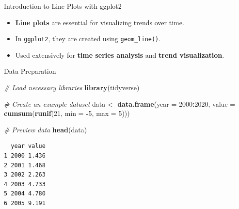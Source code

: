 \documentclass[
  ignorenonframetext,
]{beamer}
\newenvironment{Shaded}{\begin{snugshade}}{\end{snugshade}}
\newcommand{\AttributeTok}[1]{\textcolor[rgb]{0.13,0.29,0.53}{#1}}
\newcommand{\CommentTok}[1]{\textcolor[rgb]{0.56,0.35,0.01}{\textit{#1}}}
\newcommand{\DecValTok}[1]{\textcolor[rgb]{0.00,0.00,0.81}{#1}}
\newcommand{\FunctionTok}[1]{\textcolor[rgb]{0.13,0.29,0.53}{\textbf{#1}}}
\newcommand{\NormalTok}[1]{#1}
\newcommand{\OtherTok}[1]{\textcolor[rgb]{0.56,0.35,0.01}{#1}}
\newcommand{\SpecialCharTok}[1]{\textcolor[rgb]{0.81,0.36,0.00}{\textbf{#1}}}
\providecommand{\tightlist}{%
  \setlength{\itemsep}{0pt}\setlength{\parskip}{0pt}}
\begin{document}
\begin{frame}[fragile]{Introduction to Line Plots with ggplot2}
\label{introduction-to-line-plots-with-ggplot2}
\begin{itemize}
\tightlist
\item
  \textbf{Line plots} are essential for visualizing trends over time.
\item
  In \texttt{ggplot2}, they are created using \texttt{geom\_line()}.
\item
  Used extensively for \textbf{time series analysis} and \textbf{trend
  visualization}.
\end{itemize}
\end{frame}

\begin{frame}[fragile]{Data Preparation}
\label{data-preparation}
\begin{Shaded}
\begin{Highlighting}[]
\CommentTok{\# Load necessary libraries}
\FunctionTok{library}\NormalTok{(tidyverse)}

\CommentTok{\# Create an example dataset}
\NormalTok{data }\OtherTok{\textless{}{-}} \FunctionTok{data.frame}\NormalTok{(}\AttributeTok{year =} \DecValTok{2000}\SpecialCharTok{:}\DecValTok{2020}\NormalTok{, }\AttributeTok{value =} \FunctionTok{cumsum}\NormalTok{(}\FunctionTok{runif}\NormalTok{(}\DecValTok{21}\NormalTok{,}
    \AttributeTok{min =} \SpecialCharTok{{-}}\DecValTok{5}\NormalTok{, }\AttributeTok{max =} \DecValTok{5}\NormalTok{)))}

\CommentTok{\# Preview data}
\FunctionTok{head}\NormalTok{(data)}
\end{Highlighting}
\end{Shaded}

\begin{verbatim}
  year value
1 2000 1.436
2 2001 1.468
3 2002 2.263
4 2003 4.733
5 2004 4.780
6 2005 9.191
\end{verbatim}
\end{frame}
\end{document}
